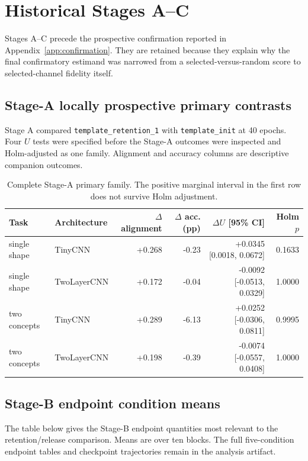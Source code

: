 \section{Historical Stages A--C}\label{app:historical}

Stages A--C precede the prospective confirmation reported in Appendix~\ref{app:confirmation}. They are retained because they explain why the final confirmatory estimand was narrowed from a selected-versus-random score to selected-channel fidelity itself.

\subsection{Stage-A locally prospective primary contrasts}\label{app:stage-a}

Stage A compared \texttt{template\_retention\_1} with \texttt{template\_init} at 40 epochs. Four $U$ tests were specified before the Stage-A outcomes were inspected and Holm-adjusted as one family. Alignment and accuracy columns are descriptive companion outcomes.

\begin{table}[h]
\caption{Complete Stage-A primary family. The positive marginal interval in the first row does not survive Holm adjustment.}
\label{tab:stage-a-primary}
\centering
\small
\setlength{\tabcolsep}{3pt}
\begin{tabular}{llrrrr}
\toprule
Task & Architecture & $\Delta$ alignment & $\Delta$ acc. (pp) & $\Delta U$ [95\% CI] & Holm $p$ \\
\midrule
single shape & TinyCNN & +0.268 & -0.23 & +0.0345 [0.0018, 0.0672] & 0.1633 \\
single shape & TwoLayerCNN & +0.172 & -0.04 & -0.0092 [-0.0513, 0.0329] & 1.0000 \\
two concepts & TinyCNN & +0.289 & -6.13 & +0.0252 [-0.0306, 0.0811] & 0.9995 \\
two concepts & TwoLayerCNN & +0.198 & -0.39 & -0.0074 [-0.0557, 0.0408] & 1.0000 \\
\bottomrule
\end{tabular}
\end{table}

\subsection{Stage-B endpoint condition means}\label{app:stage-b-endpoints}

The table below gives the Stage-B endpoint quantities most relevant to the retention/release comparison. Means are over ten blocks. The full five-condition endpoint tables and checkpoint trajectories remain in the analysis artifact.

